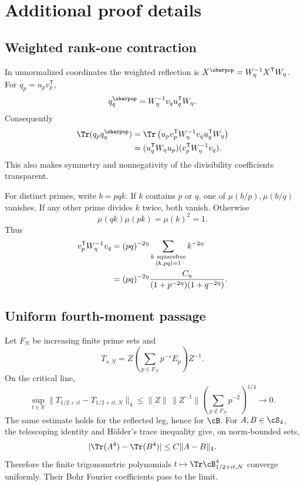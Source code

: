 \section{Additional proof details}

\subsection{Weighted rank-one contraction}
\label{app:gram}

In unnormalized coordinates the weighted reflection is
$X^{\sharpop}=W_\eta^{-1}X^{\mathsf T}W_\eta$.  For
$q_p=u_pv_p^{\mathsf T}$,
\[
 q_q^{\sharpop}
 =W_\eta^{-1}v_qu_q^{\mathsf T}W_\eta.
\]
Consequently
\[
\begin{aligned}
\Tr(q_pq_q^{\sharpop})
&=\Tr\left(
u_pv_p^{\mathsf T}W_\eta^{-1}v_qu_q^{\mathsf T}W_\eta
\right)\\
&=(u_q^{\mathsf T}W_\eta u_p)
  (v_p^{\mathsf T}W_\eta^{-1}v_q).
\end{aligned}
\]
This also makes symmetry and nonnegativity of the divisibility
coefficients transparent.

For distinct primes, write $b=pqk$.  If $k$ contains $p$ or $q$, one
of $\mu(b/p),\mu(b/q)$ vanishes.  If any other prime divides $k$
twice, both vanish.  Otherwise
\[
 \mu(qk)\mu(pk)=\mu(k)^2=1.
\]
Thus
\[
\begin{aligned}
v_p^{\mathsf T}W_\eta^{-1}v_q
&=(pq)^{-2\eta}
\sum_{\substack{k\ {\rm squarefree}\\(k,pq)=1}}k^{-2\eta}\\
&=(pq)^{-2\eta}
\frac{C_\eta}
{(1+p^{-2\eta})(1+q^{-2\eta})}.
\end{aligned}
\]

\subsection{Uniform fourth-moment passage}
\label{app:fourier}

Let $F_N$ be increasing finite prime sets and
\[
 T_{s,N}=Z\left(\sum_{p\in F_N}p^{-s}E_p\right)Z^{-1}.
\]
On the critical line,
\[
 \sup_{t\in\mathbb R}
 \|T_{1/2+it}-T_{1/2+it,N}\|_4
 \le
 \|Z\|\,\|Z^{-1}\|
 \left(\sum_{p\notin F_N}p^{-2}\right)^{1/4}
 \longrightarrow0.
\]
The same estimate holds for the reflected leg, hence for $\cB$.
For $A,B\in\cS_4$, the telescoping identity and H\"older's trace
inequality give, on norm-bounded sets,
\[
 |\Tr(A^4)-\Tr(B^4)|
 \le C\|A-B\|_4.
\]
Therefore the finite trigonometric polynomials
$t\mapsto\Tr\cB_{1/2+it,N}^4$ converge uniformly.  Their Bohr Fourier
coefficients pass to the limit.

